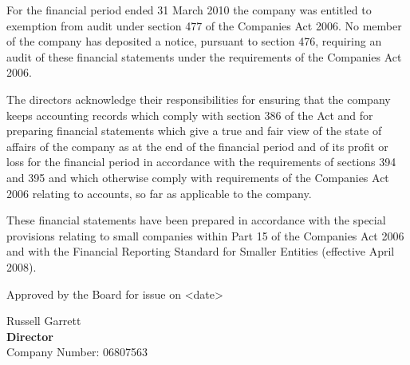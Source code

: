 {\footnotesize For the financial period ended 31 March 2010 the
company was entitled to exemption from audit under section 477 of the
Companies Act 2006. No member of the company has deposited a
notice, pursuant to section 476, requiring an audit of these
financial statements under the requirements of the Companies Act
2006.

The directors acknowledge their responsibilities for ensuring that
the company keeps accounting records which comply with section 386
of the Act and for preparing financial statements which give a true
and fair view of the state of affairs of the company as at the end
of the financial period and of its profit or loss for the financial
period in accordance with the requirements of sections 394 and 395
and which otherwise comply with requirements of the Companies Act
2006 relating to accounts, so far as applicable to the company.

These financial statements have been prepared in accordance with
the special provisions relating to small companies within Part 15
of the Companies Act 2006 and with the Financial Reporting Standard
for Smaller Entities (effective April 2008).}

\vfill

Approved by the Board for issue on <date>
\vspace{48pt}

Russell Garrett \\
{\bf Director} \\
Company Number: 06807563
